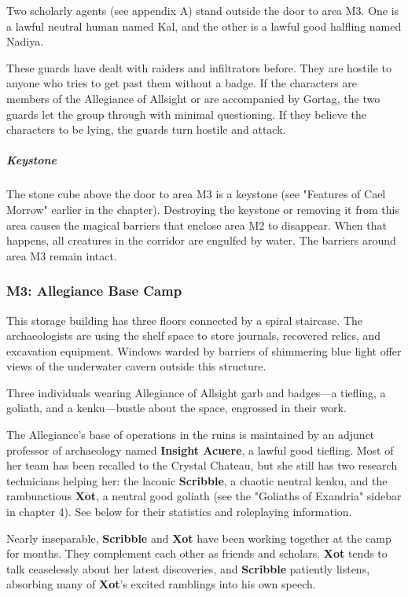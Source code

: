 \documentclass[10pt,a4paper,twoside,fancy,bg=print,twocolumn,openany,nodeprecatedcode]{dndbook}
\begin{document}
Two scholarly agents (see appendix A) stand outside the door to area M3. One is a lawful neutral human named Kal, and the other is a lawful good halfling named Nadiya.

These guards have dealt with raiders and infiltrators before. They are hostile to anyone who tries to get past them without a badge. If the characters are members of the Allegiance of Allsight or are accompanied by Gortag, the two guards let the group through with minimal questioning. If they believe the characters to be lying, the guards turn hostile and attack.

\subparagraph{Keystone}
The stone cube above the door to area M3 is a keystone (see "Features of Cael Morrow" earlier in the chapter). Destroying the keystone or removing it from this area causes the magical barriers that enclose area M2 to disappear. When that happens, all creatures in the corridor are engulfed by water. The barriers around area M3 remain intact.

\subsubsection{M3: Allegiance Base Camp}
\begin{DndReadAloud}{}
This storage building has three floors connected by a spiral staircase. The archaeologists are using the shelf space to store journals, recovered relics, and excavation equipment. Windows warded by barriers of shimmering blue light offer views of the underwater cavern outside this structure.

Three individuals wearing Allegiance of Allsight garb and badges—a tiefling, a goliath, and a kenku—bustle about the space, engrossed in their work.

\end{DndReadAloud}

The Allegiance's base of operations in the ruins is maintained by an adjunct professor of archaeology named \textbf{Insight Acuere}, a lawful good tiefling. Most of her team has been recalled to the Crystal Chateau, but she still has two research technicians helping her: the laconic \textbf{Scribble}, a chaotic neutral kenku, and the rambunctious \textbf{Xot}, a neutral good goliath (see the "Goliaths of Exandria" sidebar in chapter 4). See below for their statistics and roleplaying information.

Nearly inseparable, \textbf{Scribble} and \textbf{Xot} have been working together at the camp for months. They complement each other as friends and scholars. \textbf{Xot} tends to talk ceaselessly about her latest discoveries, and \textbf{Scribble} patiently listens, absorbing many of \textbf{Xot}'s excited ramblings into his own speech.
\end{document}
